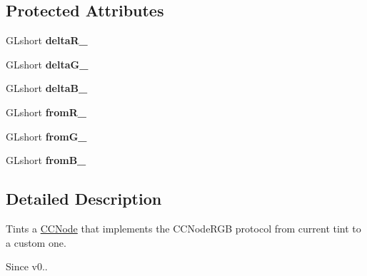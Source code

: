 \subsection*{Protected Attributes}
\begin{DoxyCompactItemize}
\item 
\hypertarget{interface_c_c_tint_by_ae823acc38ce98abb71e72a5dcc0ea3cd}{G\-Lshort {\bfseries delta\-R\-\_\-}}\label{interface_c_c_tint_by_ae823acc38ce98abb71e72a5dcc0ea3cd}

\item 
\hypertarget{interface_c_c_tint_by_a61a99ace117a86d3e63230de343682a3}{G\-Lshort {\bfseries delta\-G\-\_\-}}\label{interface_c_c_tint_by_a61a99ace117a86d3e63230de343682a3}

\item 
\hypertarget{interface_c_c_tint_by_a057af9e5a266c73792bef73dfeff6faa}{G\-Lshort {\bfseries delta\-B\-\_\-}}\label{interface_c_c_tint_by_a057af9e5a266c73792bef73dfeff6faa}

\item 
\hypertarget{interface_c_c_tint_by_a4b0bea768f5ed8f63d29157fc55cebfa}{G\-Lshort {\bfseries from\-R\-\_\-}}\label{interface_c_c_tint_by_a4b0bea768f5ed8f63d29157fc55cebfa}

\item 
\hypertarget{interface_c_c_tint_by_ad5896145f98c9b2b4c6d6a1fb80ea7d4}{G\-Lshort {\bfseries from\-G\-\_\-}}\label{interface_c_c_tint_by_ad5896145f98c9b2b4c6d6a1fb80ea7d4}

\item 
\hypertarget{interface_c_c_tint_by_ab30c757c096cb1b326b5fb1cd184dd1d}{G\-Lshort {\bfseries from\-B\-\_\-}}\label{interface_c_c_tint_by_ab30c757c096cb1b326b5fb1cd184dd1d}

\end{DoxyCompactItemize}


\subsection{Detailed Description}
Tints a \hyperlink{class_c_c_node}{C\-C\-Node} that implements the C\-C\-Node\-R\-G\-B protocol from current tint to a custom one. \begin{DoxySince}{Since}
v0.. 
\end{DoxySince}


